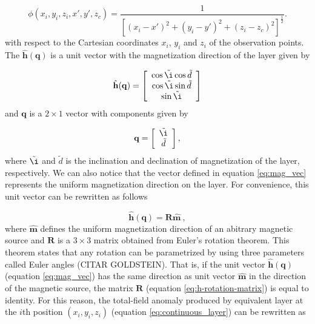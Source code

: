 \begin{equation}
\phi (x_i,y_i,z_i,x',y',z_c) = \frac{1}{[(x_i-x')^2 + (y_i-y')^2 + (z_i-z_c)^2]^{\frac{1}{2}}} .
\label{eq:phi}
\end{equation}
with respect to the Cartesian coordinates $x_i$, $y_i$ and $z_i$ of the observation points. The $\hat{\mathbf{h}}(\mathbf{q})$ is a unit vector with the magnetization direction of the layer given by 

\begin{equation}
	\hat{\mathbf{h}}(\mathbf{q}) =
	\left[ \begin{array}{c}
		\cos \tilde{\i} \cos \tilde{d} \\
		\cos \tilde{\i} \sin \tilde{d}\\
		\sin \tilde{\i}
	\end{array} \right] 
	\label{eq:mag_vec}
\end{equation}
and $\mathbf{q}$ is a $2 \times 1$ vector with components given by 

\begin{equation}
	\mathbf{q} =
	\left[ \begin{array}{c}
		\tilde{\i} \\ 
		\tilde{d} 
	\end{array} \right] ,
	\label{eq:q_vector}
\end{equation}
where $\tilde{\i} $ and $\tilde{d} $ is the inclination and declination of magnetization of the layer, respectively. We can also notice that the vector defined in equation \ref{eq:mag_vec} represents the uniform magnetization direction on the layer. For convenience, this unit vector can be rewritten as follows

\begin{equation}
\hat{\mathbf{h}}(\mathbf{q}) = \mathbf{R}\hat{\mathbf{m}} \: ,
\label{eq:h-rotation-matrix}
\end{equation}
where $\hat{\mathbf{m}}$ defines the uniform magnetization direction of an abitrary magnetic source and $\mathbf{R}$ is a $3 \times 3$ matrix obtained from Euler's rotation theorem. This theorem states that any rotation can be parametrized by using three parameters called Euler angles (CITAR GOLDSTEIN). That is, if the unit vector $\hat{\mathbf{h}}(\mathbf{q})$ (equation \ref{eq:mag_vec}) has the same direction as unit vector  $\hat{\mathbf{m}}$ in the direction of the magnetic source, the matrix $\mathbf{R}$ (equation \ref{eq:h-rotation-matrix}) is equal to identity. For this reason, the total-field anomaly produced by equivalent layer at the $i$th position $(x_i,y_i,z_i)$ (equation \ref{eq:continuous_layer}) can be rewritten as 

